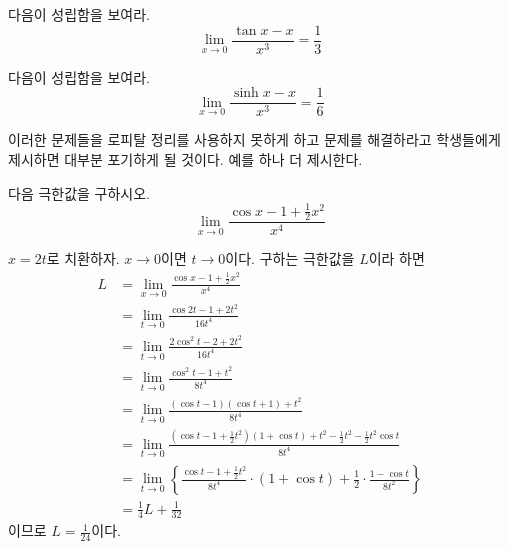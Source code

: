 \documentclass[11pt, a4paper]{book}
\begin{document}
\begin{problem}
다음이 성립함을 보여라.
\begin{equation*}
\displaystyle\lim_{x\to 0}\frac{\tan x - x}{x^{3}}=\frac{1}{3}
\end{equation*}
\end{problem}
\vspace{1em}
\begin{problem}
	다음이 성립함을 보여라.
	\begin{equation*}
	\displaystyle\lim_{x\to 0}\frac{\sinh x - x}{x^{3}}=\frac{1}{6}
	\end{equation*}
\end{problem}
\vspace{1em}
	이러한 문제들을 로피탈 정리를 사용하지 못하게 하고 문제를 해결하라고 학생들에게 제시하면 대부분 포기하게 될 것이다.  예를 하나 더 제시한다.

\begin{example}
	다음 극한값을 구하시오.
	\begin{equation*}
		\displaystyle\lim_{x\to 0}\frac{\cos x - 1 +\frac{1}{2}x^{2}}{x^{4}}
	\end{equation*}
	\begin{solution}
	$x = 2t$로 치환하자. $x\to 0$이면 $t\to 0$이다. 구하는 극한값을 $L$이라 하면
		\begin{align*}
		L & =\displaystyle\lim_{x\to 0}\frac{\cos x - 1 +\frac{1}{2}x^{2}}{x^{4}}\\
		& =\displaystyle\lim_{t\to 0}\frac{\cos 2t - 1 + 2t^{2}}{16 t^{4}}\\
		& =\displaystyle\lim_{t\to 0}\frac{2\cos^{2}t-2+2t^{2}}{16t^{4}}\\
		& =\displaystyle\lim_{t\to 0}\frac{\cos^{2}t -1 + t^{2}}{8t^{4}}\\
		& =\displaystyle\lim_{t\to 0}\frac{(\cos t-1)(\cos t +1) +t^{2}}{8t^{4}}\\
		& =\displaystyle\lim_{t\to 0}\frac{(\cos t -1 +\frac{1}{2}t^{2})(1+\cos t)+ t^{2}-\frac{1}{2}t^{2}-\frac{1}{2}t^{2}\cos t}{8t^{4}}\\
		& =\displaystyle\lim_{t\to 0}\left\{\frac{\cos t -1 +\frac{1}{2}t^{2}}{8t^{4}}\cdot (1+\cos t)+\frac{1}{2}\cdot\frac{1-\cos t}{8 t^{2}}\right\}\\
		& =\frac{1}{4}L +\frac{1}{32}
	\end{align*}
	이므로 $L =\frac{1}{24}$이다.
	\end{solution}
\end{example}
\end{document}
